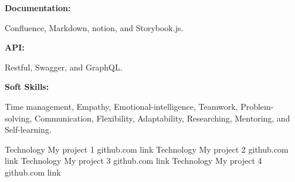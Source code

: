 \documentclass[9pt]{developercv} %
\begin{document}
\begin{minipage}[t]{0.465\textwidth}
        \begin{minipage}[t]{0.3\textwidth}
            \textbf{Documentation:}
        \end{minipage}
        \hfill
        \begin{minipage}[t]{0.73\textwidth}
            Confluence, Markdown, notion, and Storybook.js.
        \end{minipage}
        \vspace{4mm}

        \begin{minipage}[t]{0.2\textwidth}
            \textbf{API:}
        \end{minipage}
        \hfill
        \begin{minipage}[t]{0.73\textwidth}
            Restful, Swagger, and GraphQL.
        \end{minipage}
        \vspace{4mm}

        \begin{minipage}[t]{0.2\textwidth}
            \textbf{Soft Skills:}
        \end{minipage}
        \hfill
        \begin{minipage}[t]{0.73\textwidth}
            Time management, Empathy, Emotional-intelligence, Teamwork, Problem-solving, Communication, Flexibility, Adaptability, Researching, Mentoring, and Self-learning.
        \end{minipage}

    \end{minipage}

    \begin{entrylist}
        \entry
        {Technology}
        {My project 1}
        {github.com link}
        {%
            \lipsum[1][1-3]}
        \entry
        {Technology}
        {My project 2}
        {github.com link}
        {%
            \lipsum[1][1-3]}
        \entry
        {Technology}
        {My project 3}
        {github.com link}
        {%
            \lipsum[1][1-3]}
        \entry
        {Technology}
        {My project 4}
        {github.com link}
        {%
            \lipsum[1][1-3]}
    \end{entrylist}
\end{document}

